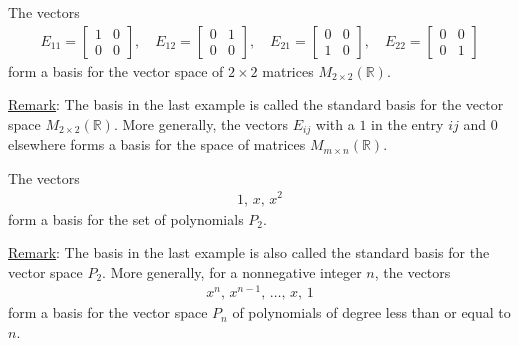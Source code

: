 \documentclass[12pt,a4paper]{article}
\newcounter{example}[section]
\begin{document}
	\begin{example}
	The vectors
		\begin{align*}
		E_{11} = \begin{bmatrix}
		1 & 0 \\
		0 & 0 
		\end{bmatrix}
		, \quad
		E_{12} = \begin{bmatrix}
		0 & 1 \\
		0 & 0
		\end{bmatrix} 
		, \quad
		E_{21} = \begin{bmatrix}
		0 & 0 \\
		1 & 0
		\end{bmatrix}
		, \quad
		E_{22} = \begin{bmatrix}
		0 & 0 \\
		0 & 1
		\end{bmatrix}
		\end{align*}
	form a basis for the vector space of $2 \times 2$ matrices $M_{2 \times 2} (\mathbb{R})$.
	\end{example}
	
	\vspace*{20pt}
	
	\noindent\underline{Remark}: The basis in the last example is called the standard basis for the vector space $M_{2 \times 2} (\mathbb{R})$. More generally, the vectors $E_{ij}$ with a $1$ in the entry $ij$ and $0$ elsewhere forms a basis for the space of matrices $M_{m \times n } (\mathbb{R})$.
	
	\vspace*{25pt}
	
	\begin{example}
	The vectors
		\begin{align*}
		1, \, x , \, x^2
		\end{align*}
	form a basis for the set of polynomials $P_2$.
	\end{example}
	
	\vfill
	
	\noindent\underline{Remark}: The basis in the last example is also called the standard basis for the vector space $P_2$. More generally, for a nonnegative integer $n$, the vectors
		\begin{align*}
		x^n , \, x^{n-1} , \, \ldots , \, x , \, 1
		\end{align*}
	form a basis for the vector space $P_n$ of polynomials of degree less than or equal to $n$.
	
	\newpage
	
\end{document}
